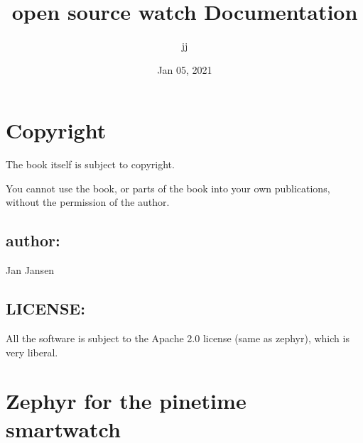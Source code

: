 \documentclass[letterpaper,10pt,english]{sphinxmanual}
\title{open source watch Documentation}
\date{Jan 05, 2021}
\author{jj}
\begin{document}
\pagestyle{empty}
\sphinxmaketitle
\pagestyle{plain}
\sphinxtableofcontents
\pagestyle{normal}
\label{\detokenize{index::doc}}
\noindent{}




\chapter{Copyright}
\label{\detokenize{copyright:copyright}}\label{\detokenize{copyright::doc}}

The book itself is subject to copyright.

You cannot use the book, or parts of the book into your own publications, without the permission of the author.


\section{author:}
\label{\detokenize{copyright:author}}
Jan Jansen


\section{LICENSE:}
\label{\detokenize{copyright:license}}
All the software is subject to the Apache 2.0 license (same as zephyr), which is very liberal.


\chapter{Zephyr for the pinetime smartwatch}
\label{\detokenize{content:zephyr-for-the-pinetime-smartwatch}}\label{\detokenize{content::doc}}
\begin{sphinxVerbatim}[commandchars=\\\{\}]
           


           
\end{sphinxVerbatim}
\end{document}
